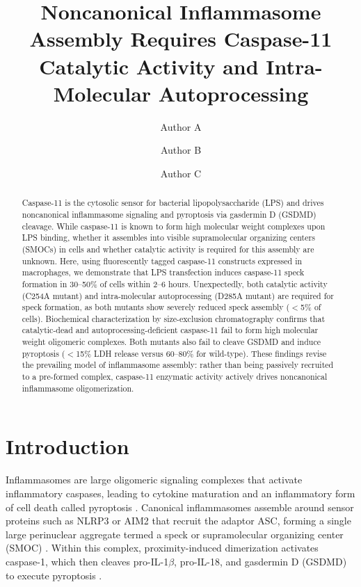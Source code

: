\documentclass[11pt]{article}
\title{Noncanonical Inflammasome Assembly Requires Caspase-11 Catalytic Activity and Intra-Molecular Autoprocessing}
\author[1]{Author A}
\author[1]{Author B}
\author[1,2]{Author C}
\affil[1]{Department of Immunology, School of Medicine, University of Connecticut, Farmington, CT, USA}
\affil[2]{Institute for Systems Genomics, University of Connecticut, Farmington, CT, USA}
\date{}
\begin{document}
\maketitle

\begin{abstract}
Caspase-11 is the cytosolic sensor for bacterial lipopolysaccharide (LPS) and drives noncanonical inflammasome signaling and pyroptosis via gasdermin D (GSDMD) cleavage. While caspase-11 is known to form high molecular weight complexes upon LPS binding, whether it assembles into visible supramolecular organizing centers (SMOCs) in cells and whether catalytic activity is required for this assembly are unknown. Here, using fluorescently tagged caspase-11 constructs expressed in macrophages, we demonstrate that LPS transfection induces caspase-11 speck formation in 30--50\% of cells within 2--6 hours. Unexpectedly, both catalytic activity (C254A mutant) and intra-molecular autoprocessing (D285A mutant) are required for speck formation, as both mutants show severely reduced speck assembly ($<$5\% of cells). Biochemical characterization by size-exclusion chromatography confirms that catalytic-dead and autoprocessing-deficient caspase-11 fail to form high molecular weight oligomeric complexes. Both mutants also fail to cleave GSDMD and induce pyroptosis ($<$15\% LDH release versus 60--80\% for wild-type). These findings revise the prevailing model of inflammasome assembly: rather than being passively recruited to a pre-formed complex, caspase-11 enzymatic activity actively drives noncanonical inflammasome oligomerization.
\end{abstract}

\section{Introduction}

Inflammasomes are large oligomeric signaling complexes that activate inflammatory caspases, leading to cytokine maturation and an inflammatory form of cell death called pyroptosis \citep{broz2016inflammasomes}. Canonical inflammasomes assemble around sensor proteins such as NLRP3 or AIM2 that recruit the adaptor ASC, forming a single large perinuclear aggregate termed a speck or supramolecular organizing center (SMOC) \citep{lu2014unified}. Within this complex, proximity-induced dimerization activates caspase-1, which then cleaves pro-IL-1$\beta$, pro-IL-18, and gasdermin D (GSDMD) to execute pyroptosis \citep{shi2015cleavage}.
\end{document}
